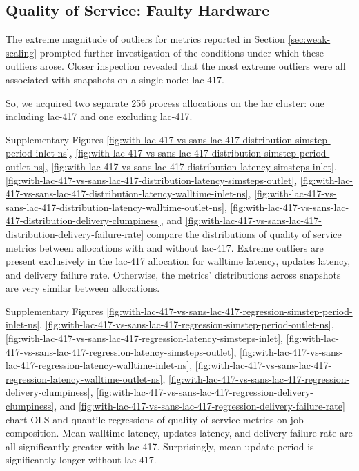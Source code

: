 \subsection{Quality of Service: Faulty Hardware}
\label{sec:with-lac-417-vs-sans-lac-417}

The extreme magnitude of outliers for metrics reported in Section \ref{sec:weak-scaling} prompted further investigation of the conditions under which these outliers arose.
Closer inspection revealed that the most extreme outliers were all associated with snapshots on a single node: lac-417.

So, we acquired two separate 256 process allocations on the lac cluster: one including lac-417 and one excluding lac-417.

Supplementary Figures \ref{fig:with-lac-417-vs-sans-lac-417-distribution-simstep-period-inlet-ns}, \ref{fig:with-lac-417-vs-sans-lac-417-distribution-simstep-period-outlet-ns}, \ref{fig:with-lac-417-vs-sans-lac-417-distribution-latency-simsteps-inlet}, \ref{fig:with-lac-417-vs-sans-lac-417-distribution-latency-simsteps-outlet}, \ref{fig:with-lac-417-vs-sans-lac-417-distribution-latency-walltime-inlet-ns}, \ref{fig:with-lac-417-vs-sans-lac-417-distribution-latency-walltime-outlet-ns}, \ref{fig:with-lac-417-vs-sans-lac-417-distribution-delivery-clumpiness}, and \ref{fig:with-lac-417-vs-sans-lac-417-distribution-delivery-failure-rate} compare the distributions of quality of service metrics between allocations with and without lac-417.
Extreme outliers are present exclusively in the lac-417 allocation for walltime latency, updates latency, and delivery failure rate.
Otherwise, the metrics' distributions across snapshots are very similar between allocations.

Supplementary Figures \ref{fig:with-lac-417-vs-sans-lac-417-regression-simstep-period-inlet-ns}, \ref{fig:with-lac-417-vs-sans-lac-417-regression-simstep-period-outlet-ns}, \ref{fig:with-lac-417-vs-sans-lac-417-regression-latency-simsteps-inlet}, \ref{fig:with-lac-417-vs-sans-lac-417-regression-latency-simsteps-outlet}, \ref{fig:with-lac-417-vs-sans-lac-417-regression-latency-walltime-inlet-ns}, \ref{fig:with-lac-417-vs-sans-lac-417-regression-latency-walltime-outlet-ns}, \ref{fig:with-lac-417-vs-sans-lac-417-regression-delivery-clumpiness}, \ref{fig:with-lac-417-vs-sans-lac-417-regression-delivery-clumpiness}, and
\ref{fig:with-lac-417-vs-sans-lac-417-regression-delivery-failure-rate} chart OLS and quantile regressions of quality of service metrics on job composition.
Mean walltime latency, updates latency, and delivery failure rate are all significantly greater with lac-417.
Surprisingly, mean update period is significantly longer without lac-417.


